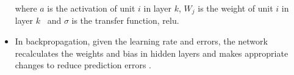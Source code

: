 \begin{sloppypar}
\begin{itemize}
			where $a$ is the activation of unit $ i $ in layer $ k $, $W_j$ is the weight of unit $ i $ in layer $ k $  and $\sigma$ is the transfer function, \ac{relu}.
			
			\item In backpropagation, given the learning rate and errors, the network recalculates the weights and bias in hidden layers and makes appropriate changes to reduce prediction errors \citep{Phan2019}.
		\end{itemize}
	
\end{sloppypar}